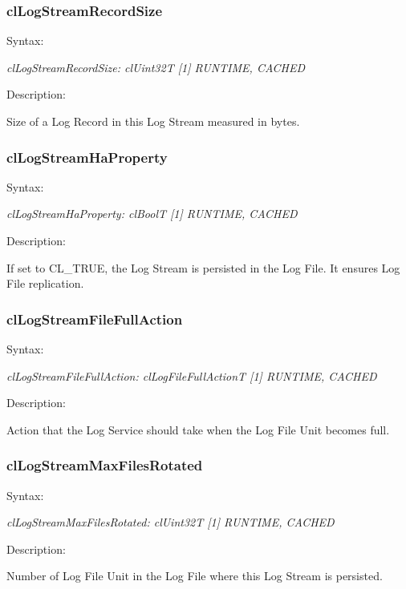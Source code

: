 \begin{flushleft}
\subsubsection{clLogStreamRecordSize}
\begin{Desc}
\item[Syntax:]
\end{Desc}
\textit{clLogStreamRecordSize: clUint32T [1] {RUNTIME, CACHED}}
\begin{Desc}
\item[Description:]
\end{Desc}
Size of a Log Record in this Log Stream measured in bytes.


\subsubsection{clLogStreamHaProperty}
\begin{Desc}
\item[Syntax:]
\end{Desc}
\textit{clLogStreamHaProperty: clBoolT [1] {RUNTIME, CACHED}}
\begin{Desc}
\item[Description:]
\end{Desc}
If set to CL\_\-TRUE, the Log Stream is persisted in the Log File. It ensures Log File replication.



\subsubsection{clLogStreamFileFullAction}
\begin{Desc}
\item[Syntax:]
\end{Desc}
\textit{clLogStreamFileFullAction: clLogFileFullActionT [1] {RUNTIME, CACHED}}
 \begin{Desc}
 \item[Description:]
\end{Desc}
Action that the Log Service should take when the Log File Unit becomes full.


\subsubsection{clLogStreamMaxFilesRotated}
\begin{Desc}
\item[Syntax:]
\end{Desc}
\textit{clLogStreamMaxFilesRotated: clUint32T [1] {RUNTIME, CACHED}}
 \begin{Desc}
 \item[Description:]
\end{Desc}
Number of Log File Unit in the Log File where this Log Stream is persisted.




\end{flushleft}
